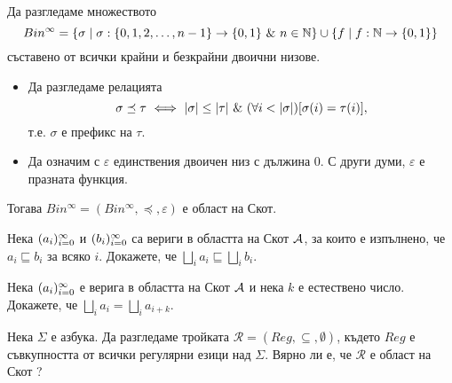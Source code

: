 \begin{example}
  Да разгледаме множеството 
  \[Bin^\infty = \{\sigma \mid \sigma :\{0,1,2,\dots,n-1\} \to \{0,1\}\ \&\ n \in \mathbb{N}\} \cup 
  \{f \mid f:\mathbb{N} \to \{0,1\}\}\]
  съставено от всички крайни и безкрайни двоични низове.
  \begin{itemize}
  \item
    Да разгледаме релацията
    \[\sigma \preceq \tau \ \Longleftrightarrow\  \vert{\sigma}\vert \leq \vert{\tau}\vert\ \&\ (\forall i < |\sigma|)[\sigma(i) = \tau(i)],\]
    т.е. $\sigma$ е префикс на $\tau$.    
  \item
    Да означим с $\varepsilon$ единствения двоичен низ с дължина $0$. С други думи, $\varepsilon$ е празната функция.
  \end{itemize}
  Тогава $Bin^\infty = (Bin^\infty,\preceq,\varepsilon)$ е област на Скот.
\end{example}

\begin{problem}
  Нека $(a_{i})^{\infty}_{i=0}$ и $(b_{i})^{\infty}_{i=0}$ са вериги в областта на Скот $\mathcal{A}$, за които е изпълнено, че
  $a_i \sqsubseteq b_i$ за всяко $i$.
  Докажете, че $\bigsqcup_i a_i \sqsubseteq \bigsqcup_i b_i$.
\end{problem}

\begin{problem}
  Нека $(a_{i})^{\infty}_{i=0}$ е верига в областта на Скот $\mathcal{A}$ и нека $k$ е естествено число.
  Докажете, че $\bigsqcup_i a_i = \bigsqcup_i a_{i+k}$.
\end{problem}

\begin{problem}
  Нека $\Sigma$ е азбука. Да разгледаме тройката $\mathcal{R} = (Reg, \subseteq, \emptyset)$, където $Reg$ е съвкупността от всички регулярни езици над $\Sigma$.
  Вярно ли е, че $\mathcal{R}$ е област на Скот ?
\end{problem}



